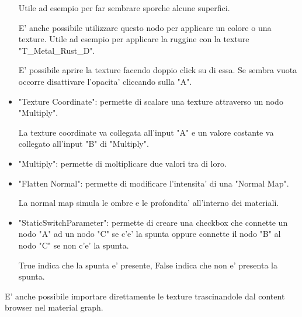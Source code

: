 \begin{itemize}
                    \begin{notebox}
                        Utile ad esempio per far sembrare sporche alcune superfici.
                    \end{notebox}

                    E' anche possibile utilizzare questo nodo per applicare un colore o una texture.
                    Utile ad esempio per applicare la ruggine con la texture "T\_Metal\_Rust\_D".

                    \begin{notebox}
                        E' possibile aprire la texture facendo doppio click su di essa. Se sembra vuota occorre disattivare l'opacita' cliccando sulla "A".
                    \end{notebox}

                \item "Texture Coordinate": permette di scalare una texture attraverso un nodo "Multiply".

                    La texture coordinate va collegata all'input "A" e un valore costante va collegato all'input "B" di "Multiply".

                \item "Multiply": permette di moltiplicare due valori tra di loro.

                \item "Flatten Normal": permette di modificare l'intensita' di una "Normal Map".

                    \begin{notebox}
                        La normal map simula le ombre e le profondita' all'interno dei materiali.
                    \end{notebox}

                \item "StaticSwitchParameter": permette di creare una checkbox che connette un nodo "A" ad un nodo "C" se c'e' la spunta oppure connette il nodo "B" al nodo "C" se non c'e' la spunta.

                    \begin{notebox}
                        True indica che la spunta e' presente, False indica che non e' presenta la spunta.
                    \end{notebox}

            \end{itemize}

            E' anche possibile importare direttamente le texture trascinandole dal content browser nel material graph.

